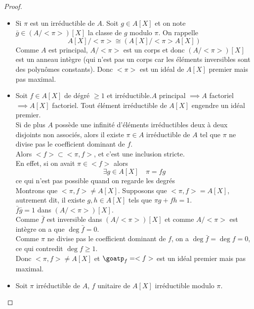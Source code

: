 \begin{proof}
	\begin{itemize}
		\item Si $\pi$ est un irréductible de $A$. Soit $g \in A[X]$ et on note $\bar{g} \in (A/<\pi>)[X]$ la classe de $g$ modulo $\pi$.
		      On rappelle
		      $$ A[X]/<\pi> \cong (A[X]/<\pi>A[X])$$
		      Comme $A$ est principal, $A/<\pi>$ est un corps et donc $(A/<\pi>)[X]$ est un anneau intègre (qui n'est pas un corps car les éléments
		      inversibles sont des polynômes constants). Donc $<\pi>$ est un idéal de $A[X]$ premier mais pas maximal.
		\item Soit $f \in A[X]$ de dégré $\geq 1$ et irréductible.$A$ principal $\implies A$ factoriel $\implies A[X]$ factoriel.
		      Tout élément irréductible de $A[X]$ engendre un idéal premier. \\
		      Si de plus $A$ possède une infinité d'éléments irréductibles deux à deux disjoints non associés, alors il existe $\pi \in A$ irréductible de $A$
		      tel que $\pi$ ne divise pas le coefficient dominant de $f$.\\
		      Alors $<f>  \subset <\pi,f>$, et c'est une inclusion stricte.\\
		      En effet, si on avait $\pi \in <f>$ alors
		      $$\exists g \in A[X]\quad \pi = fg$$ ce qui n'est pas possible quand on regarde les degrés \\
		      Montrons que $<\pi, f> \neq A[X]$.
		      Supposons que $<\pi, f> = A[X]$, autrement dit, il existe $g,h \in A[X]$ tels que $\pi g + fh = 1$.\\
		      $ \bar{f}\bar{g} = 1$ dans $(A/<\pi>)[X]$.\\
		      Comme $\bar{f}$ est inversible dans $(A/<\pi>)[X]$ et comme $A/<\pi>$ est intègre on a que $\deg \bar{f} = 0$.\\
		      Comme $\pi$ ne divise pas le coefficient dominant de $f$, on a $\deg \bar{f} = \deg f = 0$, ce qui contredit $\deg f \geq 1$.\\
		      Donc $<\pi, f> \neq A[X]$ et $\goatp_f = <f>$ est un idéal premier mais pas maximal.
		\item  Soit $\pi$ irréductible de $A$, $f$ unitaire de $A[X]$ irréductible modulo $\pi$.\\
		      \begin{centering}

\end{centering}
\end{itemize}
\end{proof}
